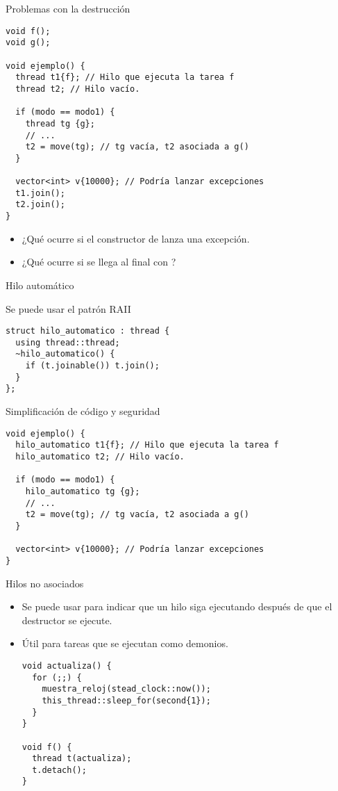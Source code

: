 \begin{frame}[fragile]{Problemas con la destrucción}
\begin{lstlisting}
void f();
void g();

void ejemplo() {
  thread t1{f}; // Hilo que ejecuta la tarea f
  thread t2; // Hilo vacío.

  if (modo == modo1) {
    thread tg {g}; 
    // ...
    t2 = move(tg); // tg vacía, t2 asociada a g()
  }

  vector<int> v{10000}; // Podría lanzar excepciones
  t1.join();
  t2.join();
}
\end{lstlisting}
\begin{itemize}
  \item ¿Qué ocurre si el constructor de  lanza una excepción.
  \item ¿Qué ocurre si se llega al final con ?
\end{itemize}
\end{frame}

\begin{frame}[fragile]{Hilo automático}
\begin{block}{Se puede usar el patrón RAII}
\begin{lstlisting}
struct hilo_automatico : thread {
  using thread::thread;
  ~hilo_automatico() { 
    if (t.joinable()) t.join(); 
  }
};
\end{lstlisting}
\end{block}
\begin{block}{Simplificación de código y seguridad}
\begin{lstlisting}
void ejemplo() {
  hilo_automatico t1{f}; // Hilo que ejecuta la tarea f
  hilo_automatico t2; // Hilo vacío.

  if (modo == modo1) {
    hilo_automatico tg {g}; 
    // ...
    t2 = move(tg); // tg vacía, t2 asociada a g()
  }

  vector<int> v{10000}; // Podría lanzar excepciones
}
\end{lstlisting}
\end{block}
\end{frame}

\begin{frame}[fragile]{Hilos no asociados}
\begin{itemize}
  \item Se puede usar  para indicar que un hilo siga ejecutando 
        después de que el destructor se ejecute.
  \item Útil para tareas que se ejecutan como demonios.
\begin{lstlisting}
void actualiza() {
  for (;;) {
    muestra_reloj(stead_clock::now());
    this_thread::sleep_for(second{1});
  }
}

void f() {
  thread t(actualiza);
  t.detach();
}
\end{lstlisting}
\end{itemize}
\end{frame}

